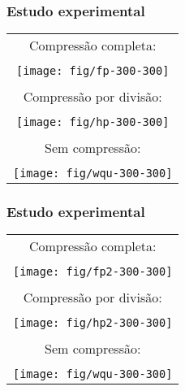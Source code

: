 \documentclass{beamer}
\begin{document}
\begin{frame}
\frametitle{Estudo experimental}

\begin{center}
\begin{tabular}[t]{c}
Compressão completa: \\
\\
\texttt{[image: fig/fp-300-300]} \\
\\
Compressão por divisão: \\
\\
\texttt{[image: fig/hp-300-300]} \\
\\
Sem compressão: \\
\\
\texttt{[image: fig/wqu-300-300]}
\end{tabular}
\end{center}

\end{frame}

\begin{frame}
\frametitle{Estudo experimental}

\begin{center}
\begin{tabular}[t]{c}
Compressão completa: \\
\\
\texttt{[image: fig/fp2-300-300]} \\
\\
Compressão por divisão: \\
\\
\texttt{[image: fig/hp2-300-300]} \\
\\
Sem compressão: \\
\\
\texttt{[image: fig/wqu-300-300]}
\end{tabular}
\end{center}

\end{frame}
\end{document}
